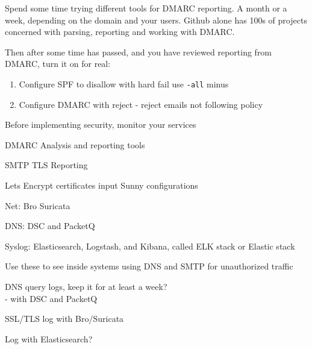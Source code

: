 \documentclass[Screen16to9,17pt]{foils}
\begin{document}
Spend some time trying different tools for DMARC reporting. A month or a week, depending on the domain and your users. Github alone has 100s of projects concerned with parsing, reporting and working with DMARC.

Then after some time has passed, and you have reviewed reporting from DMARC, turn it on for real:
\begin{enumerate}
\item Configure SPF to disallow with hard fail use \verb+-all+ minus
\item Configure DMARC with reject - reject emails not following policy
\end{enumerate}


\begin{list2}
\item Before implementing security, monitor your services
\item DMARC Analysis and reporting tools
\item SMTP TLS Reporting
\end{list2}



Lets Encrypt certificates
input Sunny configurations



\begin{list2}
\item Net: Bro  Suricata 
\item DNS: DSC and PacketQ 
\item Syslog: Elasticsearch, Logstash, and Kibana, called ELK stack or Elastic stack
\item Use these to see inside systems using DNS and SMTP for unauthorized traffic
\end{list2}




\begin{list2}
\item DNS query logs, keep it for at least a week?\\
- with DSC and PacketQ 
\item SSL/TLS log with Bro/Suricata\\
{\footnotesize{}}
\item Log with Elasticsearch?\\
{\footnotesize{}}
\end{list2}
\end{document}
